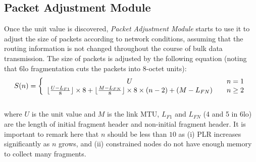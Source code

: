 \documentclass[runningheads,a4paper]{llncs}
\begin{document}
\subsection{Packet Adjustment Module} \label{sec:pa}
Once the unit value is discovered, \emph{Packet Adjustment Module} starts to use it to adjust the size of packets according to network conditions, assuming that the routing information is not changed throughout the course of bulk data transmission. The size of packets is adjusted by the following equation (noting that 6lo fragmentation cuts the packets into 8-octet units):
\begin{equation} \label{eq:size}
S(n) = \left\{
  \begin{array}{c l}
    U & \quad n=1 \\
    \lfloor \frac{U-L_{F1}}{8} \rfloor \times 8 + \lfloor \frac{M-L_{FN}}{8} \rfloor \times 8 \times (n-2) + (M-L_{FN}) & \quad n \ge 2
  \end{array}
\right.
\end{equation} \\where $U$ is the unit value and $M$ is the link MTU, $L_{F1}$ and $L_{FN}$ (4 and 5 in 6lo) are the length of initial fragment header and non-initial fragment header. It is important to remark here that $n$ should be less than $10$ as (i) PLR  increases significantly as $n$ grows, and (ii) constrained nodes do not have enough memory to collect many fragments.
\end{document}
